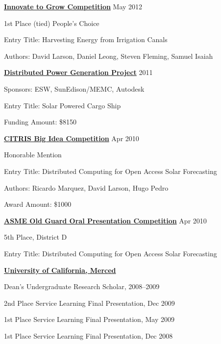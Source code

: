 \documentclass[10pt]{article}
\newcommand{\blankline}{\quad\pagebreak[3]}
\begin{document}
\textbf{\href{https://eng.ucmerced.edu/innovatetogrow}{Innovate to Grow Competition}} \hfill May 2012
\begin{innerlist}
    \item 1st Place (tied) People's Choice
    \item Entry Title: Harvesting Energy from Irrigation Canals
    \item Authors: David Larson, Daniel Leong, Steven Fleming, Samuel Isaiah
\end{innerlist}


\blankline


\textbf{\href{http://www.eswusa.org/sunedisonautodesk-projects}{Distributed Power Generation Project}} \hfill 2011
\begin{innerlist}
    \item Sponsors: ESW, SunEdison/MEMC, Autodesk
    \item Entry Title: Solar Powered Cargo Ship
    \item Funding Amount: \$8150
\end{innerlist}


\blankline


\textbf{\href{http://citris-uc.org/news/2010/04/22/citris_big_ideas_winners_2010}{CITRIS Big Idea Competition}} \hfill Apr 2010
\begin{innerlist}
    \item Honorable Mention 
    \item Entry Title: Distributed Computing for Open Access Solar Forecasting
    \item Authors: Ricardo Marquez, David Larson, Hugo Pedro
    \item Award Amount: \$1000
\end{innerlist}


\blankline


\textbf{\href{http://events.asme.org/SPDC/}{ASME Old Guard Oral Presentation Competition}} \hfill Apr 2010
\begin{innerlist}
    \item 5th Place, District D 
    \item Entry Title: Distributed Computing for Open Access Solar Forecasting
\end{innerlist}


\blankline


\textbf{\href{http://www.ucmerced.edu}{University of California, Merced}}
\begin{innerlist}
    \item Dean's Undergraduate Research Scholar, 2008--2009
    \item 2nd Place Service Learning Final Presentation, Dec 2009
    \item 1st Place Service Learning Final Presentation, May 2009
    \item 1st Place Service Learning Final Presentation, Dec 2008
\end{innerlist}
\end{document}
